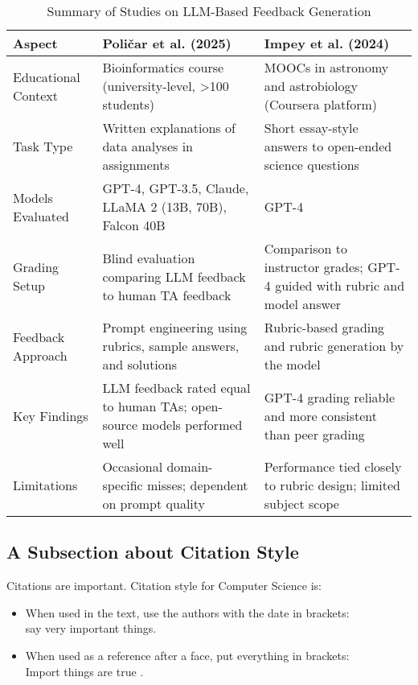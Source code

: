 \documentclass[a4paper,twoside,12pt]{report}
\begin{document}
  \begin{table}[h!]
    \centering
    \begin{tabular}{|p{3.5cm}|p{6.5cm}|p{6.5cm}|}
    \hline
    \textbf{Aspect} & \textbf{Poličar et al. (2025)} & \textbf{Impey et al. (2024)} \\
    \hline
    Educational Context & Bioinformatics course (university-level, >100 students) & MOOCs in astronomy and astrobiology (Coursera platform) \\
    \hline
    Task Type & Written explanations of data analyses in assignments & Short essay-style answers to open-ended science questions \\
    \hline
    Models Evaluated & GPT-4, GPT-3.5, Claude, LLaMA 2 (13B, 70B), Falcon 40B & GPT-4 \\
    \hline
    Grading Setup & Blind evaluation comparing LLM feedback to human TA feedback & Comparison to instructor grades; GPT-4 guided with rubric and model answer \\
    \hline
    Feedback Approach & Prompt engineering using rubrics, sample answers, and solutions & Rubric-based grading and rubric generation by the model \\
    \hline
    Key Findings & LLM feedback rated equal to human TAs; open-source models performed well & GPT-4 grading reliable and more consistent than peer grading \\
    \hline
    Limitations & Occasional domain-specific misses; dependent on prompt quality & Performance tied closely to rubric design; limited subject scope \\
    \hline
    \end{tabular}
    \caption{Summary of Studies on LLM-Based Feedback Generation}
    \label{tab:llm_feedback_studies}
    \end{table}
    













\subsection{A Subsection about Citation Style}
Citations are important. Citation style for Computer Science is:
\begin{itemize}
\item When used in the text, use the authors with the date in brackets:\\ \citet{klein17} say very important things.
\item When used as a reference after a face, put everything in brackets:\\ Import things are true \citep{klein17}.
\end{itemize}
\end{document}
